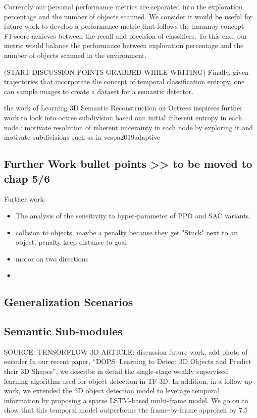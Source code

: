     Currently our personal performance metrics are separated into the exploration percentage and the number of objects scanned.
    We consider it would be useful for future work to develop a performance metric that follows the harmnoy concept F1-score achieves between the recall and precision of classifiers. To this end, our metric would balance the performance between exploration percentage and the number of objects scanned in the environment.
    
    (START DISCUSSION POINTS GRABBED WHILE WRITING)
    Finally, given trajectories that incorporate the concept of temporal classification entropy, one can sample images to create a dataset for a semantic detector. 
    
    the work of Learning 3D Semantic Reconstruction on Octrees inspirees further work to look into octree subdivision based onn initial inherent entropy in each node.: motivate resolution of inherent uncerainty in each node by exploring it and motivate subdivisions such as in vespa2019adaptive


    \subsection{Further Work bullet points >> to be moved to chap 5/6}
    Further work:
    \begin{itemize}
        \item The analysis of the sensitivity to hyper-parameter of PPO and SAC variants.
        \item collision to objects, maybe a penalty because they get "Stuck" next to an object. penalty keep distance to goal
        \item motor on two directions
        \item 
    \end{itemize}
    
    \subsection{Generalization Scenarios}\label{}
    \subsection{Semantic Sub-modules}\label{}
    
    
    SOURCE: TENSORFLOW 3D ARTICLE:
    discussion future work, add photo of encoder
    In our recent paper, “DOPS: Learning to Detect 3D Objects and Predict their 3D Shapes”, we describe in detail the single-stage weakly supervised learning algorithm used for object detection in TF 3D. In addition, in a follow up work, we extended the 3D object detection model to leverage temporal information by proposing a sparse LSTM-based multi-frame model. We go on to show that this temporal model outperforms the frame-by-frame approach by 7.5%



